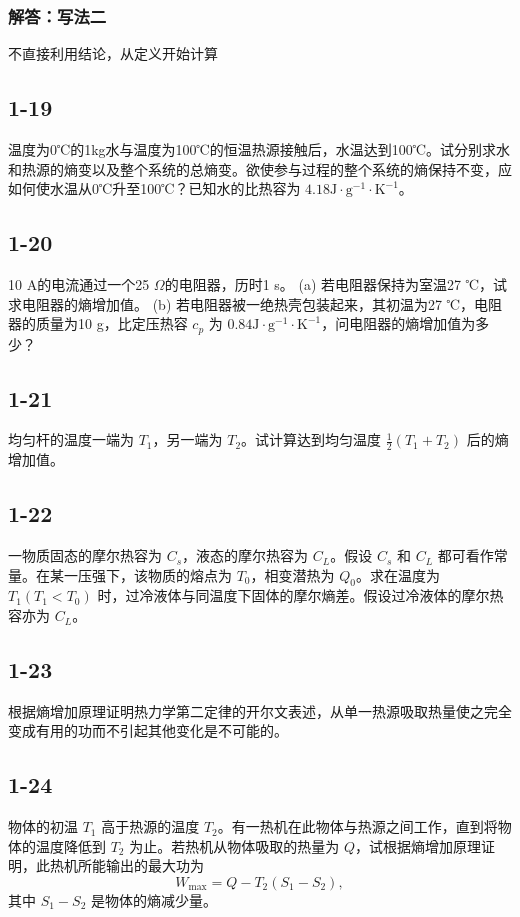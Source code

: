 \subsubsection{解答：写法二}
不直接利用结论，从定义开始计算


\newpage
\subsection{1-19}
温度为0℃的1kg水与温度为100℃的恒温热源接触后，水温达到100℃。试分别求水和热源的熵变以及整个系统的总熵变。欲使参与过程的整个系统的熵保持不变，应如何使水温从0℃升至100℃？已知水的比热容为 $4.18 \mathrm{J \cdot g^{-1} \cdot K^{-1}}$。

\newpage
\subsection{1-20}
10 A的电流通过一个25 $\Omega$的电阻器，历时1 s。
(a) 若电阻器保持为室温27 ℃，试求电阻器的熵增加值。
(b) 若电阻器被一绝热壳包装起来，其初温为27 ℃，电阻器的质量为10 g，比定压热容 $c_p$ 为 $0.84 \mathrm{J \cdot g^{-1} \cdot K^{-1}}$，问电阻器的熵增加值为多少？

\newpage
\subsection{1-21}
均匀杆的温度一端为 $T_1$，另一端为 $T_2$。试计算达到均匀温度 $\frac{1}{2}(T_1 + T_2)$ 后的熵增加值。

\newpage
\subsection{1-22}
一物质固态的摩尔热容为 $C_s$，液态的摩尔热容为 $C_L$。假设 $C_s$ 和 $C_L$ 都可看作常量。在某一压强下，该物质的熔点为 $T_0$，相变潜热为 $Q_0$。求在温度为 $T_1 (T_1 < T_0)$ 时，过冷液体与同温度下固体的摩尔熵差。假设过冷液体的摩尔热容亦为 $C_L$。

\newpage
\subsection{1-23}
根据熵增加原理证明热力学第二定律的开尔文表述，从单一热源吸取热量使之完全变成有用的功而不引起其他变化是不可能的。

\newpage
\subsection{1-24}
物体的初温 $T_1$ 高于热源的温度 $T_2$。有一热机在此物体与热源之间工作，直到将物体的温度降低到 $T_2$ 为止。若热机从物体吸取的热量为 $Q$，试根据熵增加原理证明，此热机所能输出的最大功为
$$W_{\text{max}} = Q - T_2 (S_1 - S_2),$$
其中 $S_1 - S_2$ 是物体的熵减少量。

